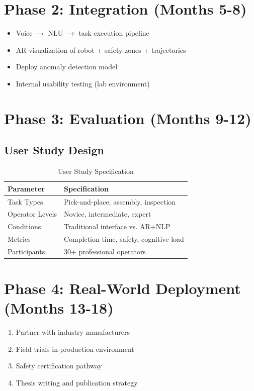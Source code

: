 \documentclass[12pt,a4paper,oneside]{book}
\begin{document}
\section{Phase 2: Integration (Months 5-8)}

\begin{itemize}
    \item Voice $\rightarrow$ NLU $\rightarrow$ task execution pipeline
    \item AR visualization of robot + safety zones + trajectories
    \item Deploy anomaly detection model
    \item Internal usability testing (lab environment)
\end{itemize}

\section{Phase 3: Evaluation (Months 9-12)}

\subsection{User Study Design}

\begin{table}[H]
\centering
\begin{tabular}{|l|l|}
\hline
\textbf{Parameter} & \textbf{Specification} \\
\hline
Task Types & Pick-and-place, assembly, inspection \\
Operator Levels & Novice, intermediate, expert \\
Conditions & Traditional interface vs. AR+NLP \\
Metrics & Completion time, safety, cognitive load \\
Participants & 30+ professional operators \\
\hline
\end{tabular}
\caption{User Study Specification}
\end{table}

\section{Phase 4: Real-World Deployment (Months 13-18)}

\begin{enumerate}
    \item Partner with industry manufacturers
    \item Field trials in production environment
    \item Safety certification pathway
    \item Thesis writing and publication strategy
\end{enumerate}
\end{document}
